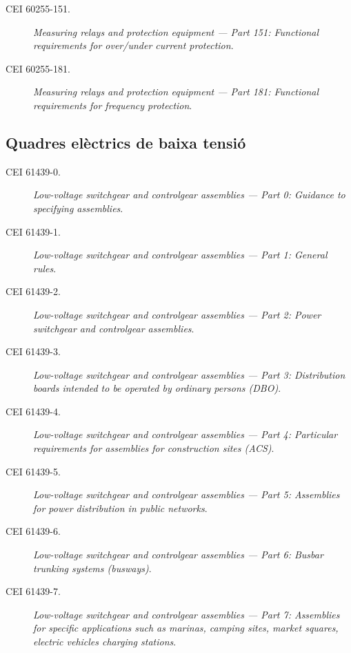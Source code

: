 \begin{description}
	\item [\hspace{5mm}CEI 60255-151.] \textit{Measuring relays and protection equipment --- Part 151:  Functional requirements for over/under current protection}.
	\item [\hspace{5mm}CEI 60255-181.] \textit{Measuring relays and protection equipment --- Part 181: Functional requirements for frequency protection}.   
\end{description}

\subsection*{Quadres elèctrics de baixa tensió}
\begin{description}
	\item [\hspace{5mm}CEI 61439-0.] \textit{Low-voltage switchgear and controlgear assemblies --- Part 0: Guidance to specifying assemblies}.
	\item [\hspace{5mm}CEI 61439-1.] \textit{Low-voltage switchgear and controlgear assemblies --- Part 1: General rules}.
	\item [\hspace{5mm}CEI 61439-2.] \textit{Low-voltage switchgear and controlgear assemblies --- Part 2: Power switchgear and controlgear assemblies}.
	\item [\hspace{5mm}CEI 61439-3.] \textit{Low-voltage switchgear and controlgear assemblies --- Part 3: Distribution boards intended to be operated by ordinary persons (DBO)}.
	\item [\hspace{5mm}CEI 61439-4.] \textit{Low-voltage switchgear and controlgear assemblies --- Part 4: Particular requirements for assemblies for construction sites (ACS)}.
	\item [\hspace{5mm}CEI 61439-5.] \textit{Low-voltage switchgear and controlgear assemblies --- Part 5: Assemblies for power distribution in public networks}.
	\item [\hspace{5mm}CEI 61439-6.] \textit{Low-voltage switchgear and controlgear assemblies --- Part 6: Busbar trunking systems (bus\-ways)}.
	\item [\hspace{5mm}CEI 61439-7.] \textit{Low-voltage switchgear and controlgear assemblies --- Part 7: Assemblies for specific applications such as marinas, camping sites, market squares, electric vehicles charging stations}.
\end{description}


